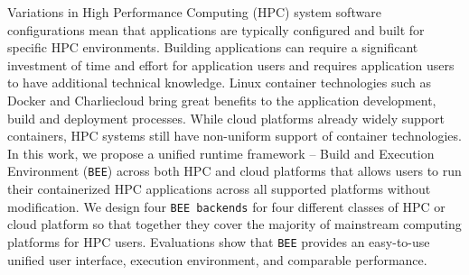 Variations in High Performance Computing (HPC) system software configurations mean that applications are typically configured and built for specific HPC environments. Building applications can require a significant investment of time and effort for application users and requires application users to have additional technical knowledge. Linux container technologies such as Docker and Charliecloud bring great benefits to the application development, build and deployment processes. While cloud platforms already widely support containers, HPC systems still have non-uniform support of container technologies. In this work, we propose a unified runtime framework -- Build and Execution Environment (\texttt{BEE}) across both HPC and cloud platforms that allows users to run their containerized HPC applications across all supported platforms without modification. We design four \texttt{BEE backends} for four different classes of HPC or cloud platform so that together they cover the majority of mainstream computing platforms for HPC users. Evaluations show that \texttt{BEE} provides an easy-to-use unified user interface, execution environment, and comparable performance.